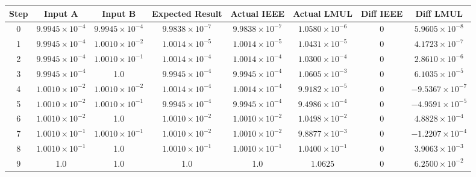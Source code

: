 \begin{tabular}{|c|c|c|c|c|c|c|c|}
\hline
Step & Input A & Input B & Expected Result & Actual IEEE & Actual LMUL & Diff IEEE & Diff LMUL \\
\hline
0 & $9.9945 \times 10^{-4}$ & $9.9945 \times 10^{-4}$ & $9.9838 \times 10^{-7}$ & $9.9838 \times 10^{-7}$ & $1.0580 \times 10^{-6}$ & 0 & $5.9605 \times 10^{-8}$ \\
\hline
1 & $9.9945 \times 10^{-4}$ & $1.0010 \times 10^{-2}$ & $1.0014 \times 10^{-5}$ & $1.0014 \times 10^{-5}$ & $1.0431 \times 10^{-5}$ & 0 & $4.1723 \times 10^{-7}$ \\
\hline
2 & $9.9945 \times 10^{-4}$ & $1.0010 \times 10^{-1}$ & $1.0014 \times 10^{-4}$ & $1.0014 \times 10^{-4}$ & $1.0300 \times 10^{-4}$ & 0 & $2.8610 \times 10^{-6}$ \\
\hline
3 & $9.9945 \times 10^{-4}$ & 1.0 & $9.9945 \times 10^{-4}$ & $9.9945 \times 10^{-4}$ & $1.0605 \times 10^{-3}$ & 0 & $6.1035 \times 10^{-5}$ \\
\hline
4 & $1.0010 \times 10^{-2}$ & $1.0010 \times 10^{-2}$ & $1.0014 \times 10^{-4}$ & $1.0014 \times 10^{-4}$ & $9.9182 \times 10^{-5}$ & 0 & $-9.5367 \times 10^{-7}$ \\
\hline
5 & $1.0010 \times 10^{-2}$ & $1.0010 \times 10^{-1}$ & $9.9945 \times 10^{-4}$ & $9.9945 \times 10^{-4}$ & $9.4986 \times 10^{-4}$ & 0 & $-4.9591 \times 10^{-5}$ \\
\hline
6 & $1.0010 \times 10^{-2}$ & 1.0 & $1.0010 \times 10^{-2}$ & $1.0010 \times 10^{-2}$ & $1.0498 \times 10^{-2}$ & 0 & $4.8828 \times 10^{-4}$ \\
\hline
7 & $1.0010 \times 10^{-1}$ & $1.0010 \times 10^{-1}$ & $1.0010 \times 10^{-2}$ & $1.0010 \times 10^{-2}$ & $9.8877 \times 10^{-3}$ & 0 & $-1.2207 \times 10^{-4}$ \\
\hline
8 & $1.0010 \times 10^{-1}$ & 1.0 & $1.0010 \times 10^{-1}$ & $1.0010 \times 10^{-1}$ & $1.0400 \times 10^{-1}$ & 0 & $3.9063 \times 10^{-3}$ \\
\hline
9 & 1.0 & 1.0 & 1.0 & 1.0 & $1.0625$ & 0 & $6.2500 \times 10^{-2}$ \\
\hline
\end{tabular}